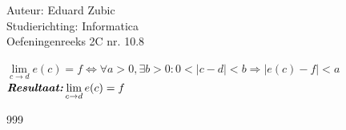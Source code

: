 \documentclass[a4paper]{article}
\begin{document}
  
\noindent \large Auteur: Eduard Zubic \\
\noindent \large Studierichting: Informatica\\
\noindent \large Oefeningenreeks 2C nr. 10.8\\

\medskip

\normalsize

$ \lim\limits_{c\rightarrow d}e(c) = f \Leftrightarrow \forall a > 0, \exists b > 0 : 0 < |c - d| < b \Rightarrow |e(c) - f| < a  $\\

$ \textbf{\textit{Resultaat:}} \lim\limits_{c\rightarrow d}e(c) = f $


\begin{thebibliography}{999} 
\end{thebibliography}
\end{document}
